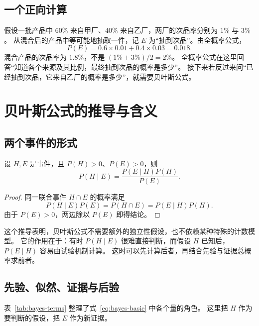 \documentclass[UTF8,12pt,a4paper,fontset=fandol]{ctexart}
\begin{document}
\subsection{一个正向计算}

假设一批产品中 $60\%$ 来自甲厂、$40\%$ 来自乙厂，两厂的次品率分别为 $1\%$ 与 $3\%$。
从混合后的产品中等可能地抽取一件，记 $E$ 为“抽到次品”。由全概率公式，
\[
  P(E)=0.6\times0.01+0.4\times0.03=0.018.
\]
混合产品的次品率为 $1.8\%$，不是 $(1\%+3\%)/2=2\%$。
全概率公式在这里回答“知道各个来源及其比例，最终抽到次品的概率是多少”。
接下来若反过来问“已经抽到次品，它来自乙厂的概率是多少”，就需要贝叶斯公式。

\section{贝叶斯公式的推导与含义}
\label{sec:bayes-formula}

\subsection{两个事件的形式}

\begin{theorem}[贝叶斯公式]
\label{thm:bayes-basic}
设 $H,E$ 是事件，且 $P(H)>0$、$P(E)>0$，则
\begin{equation}
  P(H\mid E)=\frac{P(E\mid H)P(H)}{P(E)}.
  \label{eq:bayes-basic}
\end{equation}
\end{theorem}
\begin{proof}
同一联合事件 $H\cap E$ 的概率满足
\[
  P(H\mid E)P(E)=P(H\cap E)=P(E\mid H)P(H).
\]
由于 $P(E)>0$，两边除以 $P(E)$ 即得结论。
\end{proof}

这个推导表明，贝叶斯公式不需要额外的独立性假设，也不依赖某种特殊的计数模型。
它的作用在于：有时 $P(H\mid E)$ 很难直接判断，而假设 $H$ 已知后，$P(E\mid H)$ 容易由试验机制计算。
这时可以先计算后者，再结合先验与证据总概率求前者。

\subsection{先验、似然、证据与后验}

表~\ref{tab:bayes-terms} 整理了式~\eqref{eq:bayes-basic} 中各个量的角色。
这里把 $H$ 作为要判断的假设，把 $E$ 作为新证据。
\end{document}
